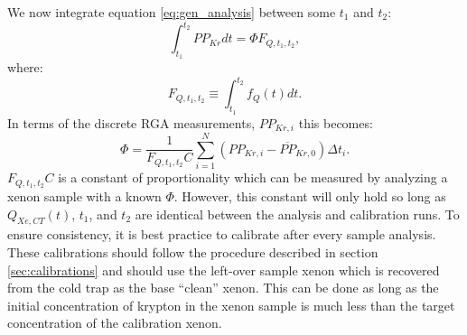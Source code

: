 \documentclass[12pt]{article}
\begin{document}
We now integrate equation \ref{eq:gen_analysis} between some $t_1$ and $t_2$:
\begin{equation}
\int_{t_1}^{t_2}PP_{Kr}dt=\Phi F_{Q,t_1,t_2},
\end{equation}
where:
\begin{equation}
F_{Q,t_1,t_2}\equiv \int_{t_1}^{t_2}f_{Q}(t) dt.
\end{equation}
In terms of the discrete RGA measurements, $PP_{Kr,i}$ this becomes:
\begin{equation}
\label{eq:int_analysis}
\Phi=\frac{1}{F_{Q,t_1,t_2}C}\sum_{i=1}^{N} (PP_{Kr,i}-\overline{PP}_{Kr,0})\Delta t_i.
\end{equation}
$F_{Q,t_1,t_2}C$ is a constant of proportionality which can be measured by analyzing a xenon sample with a known $\Phi$. However, this constant will only hold so long as $Q_{Xe,CT}(t)$, $t_1$, and $t_2$ are identical between the analysis and calibration runs. To ensure consistency, it is best practice to calibrate after every sample analysis. These calibrations should follow the procedure described in section \ref{sec:calibrations} and should use the left-over sample xenon which is recovered from the cold trap as the base ``clean'' xenon. This can be done as long as the initial concentration of krypton in the xenon sample is much less than the target concentration of the calibration xenon.
\end{document}

